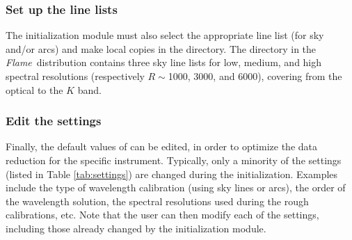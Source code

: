 \documentclass[a4paper]{article}
\newcommand{\flame}{\emph{Flame}}
\begin{document}
\begin{sloppypar}
\subsubsection{Set up the line lists}

The initialization module must also select the appropriate line list (for sky and/or arcs) and make local copies in the  directory. The  directory in the \flame\ distribution contains three sky line lists for low, medium, and high spectral resolutions (respectively $R\sim$1000, 3000, and 6000), covering from the optical to the $K$ band.


\subsubsection{Edit the settings}

Finally, the default values of  can be edited, in order to optimize the data reduction for the specific instrument. Typically, only a minority of the settings (listed in Table \ref{tab:settings}) are changed during the initialization. Examples include the type of wavelength calibration (using sky lines or arcs), the order of the wavelength solution, the spectral resolutions used during the rough calibrations, etc. Note that the user can then modify each of the settings, including those already changed by the initialization module.







\end{sloppypar}
\end{document}
